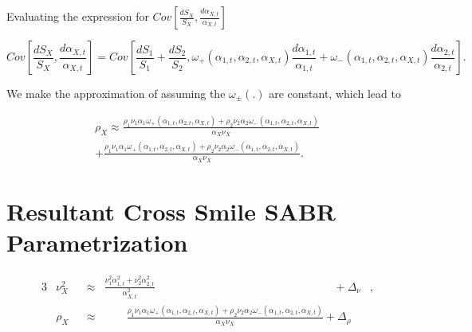 \documentclass[12pt]{article}
\begin{document}
Evaluating the expression for $Cov[\frac{dS_X}{S_X},\frac{d \alpha_{X,t}}{\alpha_{X,t}}]$

\begin{equation}
Cov[\frac{dS_X}{S_X},\frac{d \alpha_{X,t}}{\alpha_{X,t}}] = Cov[\frac{dS_1}{S_1}+\frac{dS_2}{S_2},\omega_{+}(\alpha_{1,t},\alpha_{2,t},\alpha_{X,t}) \frac{d \alpha_{1,t}}{\alpha_{1,t}} + \omega_{-}(\alpha_{1,t},\alpha_{2,t},\alpha_{X,t}) \frac{d \alpha_{2,t}}{\alpha_{2,t}}].
\end{equation}

We make the approximation of assuming the $\omega_{\pm}(.)$ are constant, which lead to 

\begin{multline}
  \rho_{X}  \approx \frac{\rho_{1} \nu_{1} \alpha_{1} \omega_{+}(\alpha_{1,t},\alpha_{2,t},\alpha_{X,t}) +\rho_{2} \nu_{2} \alpha_{2} \omega_{-}(\alpha_{1,t},\alpha_{2,t},\alpha_{X,t}) }{\alpha_{X} \nu_{X}}  \\   + \frac{ \rho_{1} \nu_{1} \alpha_{1} \omega_{+}(\alpha_{1,t},\alpha_{2,t},\alpha_{X,t}) +  \rho_{2} \nu_{2} \alpha_{2} \omega_{-}(\alpha_{1,t},\alpha_{2,t},\alpha_{X,t}) }{\alpha_{X} \nu_{X}}.
\end{multline}

\section{Resultant Cross Smile SABR Parametrization }


\begin{alignat}{3}
 &\nu^2_X && \approx & \frac{\nu^2_1\alpha^2_{1,t} + \nu^2_2\alpha^2_{2,t}}{\alpha^2_{X,t}} \qquad \qquad \qquad \qquad \qquad \qquad \qquad \qquad  + \Delta_{\nu} &, \\
 &\rho_{X} && \approx &\qquad  \frac{\rho_{1} \nu_{1} \alpha_{1} \omega_{+}(\alpha_{1,t},\alpha_{2,t},\alpha_{X,t}) +\rho_{2} \nu_{2} \alpha_{2} \omega_{-}(\alpha_{1,t},\alpha_{2,t},\alpha_{X,t}) }{\alpha_{X} \nu_{X}}  + \Delta_{\rho} &
\end{alignat}
\end{document}
